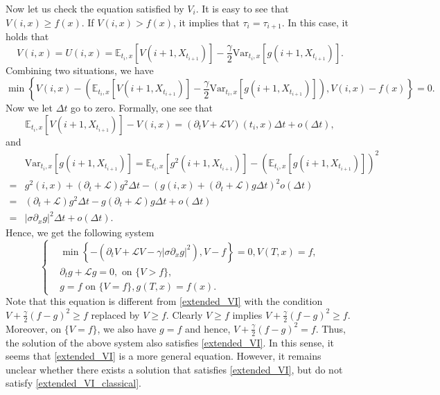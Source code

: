 \documentclass[11pt]{article}
\begin{document}
Now let us check the equation satisfied by $V_i$. It is easy to see that $V(i,x) \ge f(x) $. If $V(i,x)>f(x)$, it implies that $\tau_i=\tau_{i+1}$. In this case, it holds that 
$$
V(i,x)=U(i,x)=\mathbb E_{t_i,x}[V(i+1,X_{t_{i+1}})]-\frac{\gamma}{2}\text{Var}_{t_i,x}[g(i+1,X_{t_{i+1}})].
$$
Combining two situations, we have 
$$
\min\left\{V(i,x)-\left( \mathbb E_{t_i,x}[V(i+1,X_{t_{i+1}})]-\frac{\gamma}{2}\text{Var}_{t_i,x}[g(i+1,X_{t_{i+1}})]\right),V(i,x)-f(x)\right\}=0.
$$
Now we let  $\Delta t$ go to zero. Formally, one see that 
\begin{equation*}
 \mathbb E_{t_i,x}[V(i+1,X_{t_{i+1}})]-V(i,x)=(\partial_t V+\mathcal L V)(t_i,x)\Delta t+o(\Delta t),
\end{equation*}
and 
\begin{equation*}
	\begin{split}
&\text{Var}_{t_i,x}[g(i+1,X_{t_{i+1}})]=\mathbb E_{t_i,x}[g^2(i+1,X_{t_{i+1}})]-\left(\mathbb E_{t_i,x}[g(i+1,X_{t_{i+1}})]\right)^2\\
=&g^2(i,x)+(\partial_t+\mathcal L)g^2\Delta t-\left(g(i,x)+(\partial_t+\mathcal L)g\Delta t \right)^2  o(\Delta t)\\
=&(\partial_t+\mathcal L)g^2\Delta t-g(\partial_t+\mathcal L)g\Delta t+o(\Delta t)\\
=&|\sigma \partial_x g|^2\Delta t+o(\Delta t).
\end{split}
\end{equation*}
Hence, we get the following system
\begin{equation}\label{extended_VI_classical}
\left\{
\begin{split}
&\min\left \{-\left(\partial_t V+\mathcal LV-\gamma\left|\sigma\partial_x g \right|^2\right),V-f\right\}=0,V(T,x)=f,\\
& \partial_t g+\mathcal Lg=0, \text{ on $\{V >f\}$},\\
&g=f \text{ on $\{V =f\}$}, g(T,x)=f(x).
\end{split}
\right.
\end{equation}
Note that this equation is different from \eqref{extended_VI} with the condition $V+\frac\gamma2(f-g)^2\ge f$ replaced by $V\ge f$. Clearly $V\ge f$ implies $V+\frac\gamma2(f-g)^2\ge f$. Moreover, on $\{V=f\}$, we also have $g=f$ and hence, $V+\frac\gamma2(f-g)^2=f$. Thus, the solution of the above system also satisfies 
\eqref{extended_VI}.  In this sense, it seems that \eqref{extended_VI} is a more general equation. However, it remains unclear whether there exists a solution that satisfies  \eqref{extended_VI}, but do not satisfy \eqref{extended_VI_classical}. 
\end{document}
